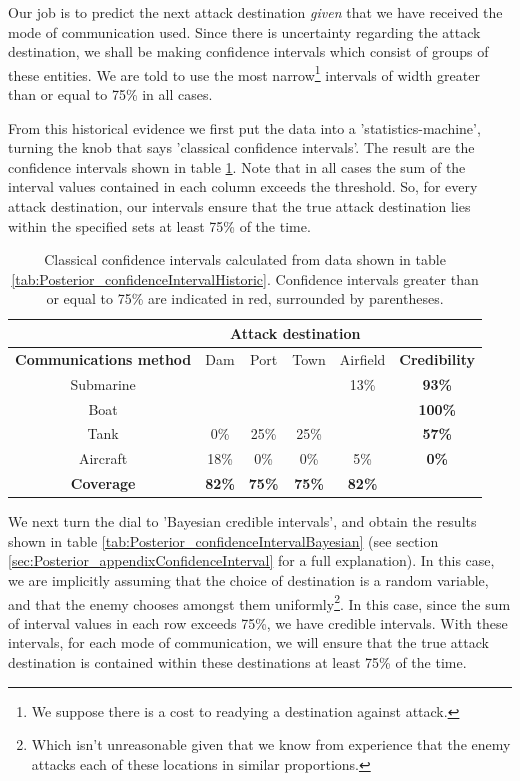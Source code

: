 \documentclass[11pt,fullpage]{book}
\begin{document}
Our job is to predict the next attack destination \textit{given} that we have received the mode of communication used. Since there is uncertainty regarding the attack destination, we shall be making confidence intervals which consist of groups of these entities. We are told to use the most narrow\footnote{We suppose there is a cost to readying a destination against attack.} intervals of width greater than or equal to 75\% in all cases.

From this historical evidence we first put the data into a 'statistics-machine', turning the knob that says 'classical confidence intervals'. The result are the confidence intervals shown in table \ref{tab:Posterior_confidenceIntervalClassical}. Note that in all cases the sum of the interval values contained in each column exceeds the threshold. So, for every attack destination, our intervals ensure that the true attack destination lies within the specified sets at least 75\% of the time.

\begin{table}[htbp]
  \centering
    \begin{tabular}{cccccc}
    \toprule
          & \multicolumn{4}{c}{\textbf{Attack destination}} & \multicolumn{1}{c}{\textbf{}} \\
    \midrule
    \textbf{Communications method} & Dam & Port & Town & Airfield   & \textbf{Credibility} \\
    Submarine & \color{red}{$[$73\%}  & \color{red}{50\%}  & \color{red}{50\%$]$}  & 13\%  & \textbf{93\%} \\
    Boat  & \color{red}{$[$9\%}   & \color{red}{25\%}  & \color{red}{25\%}  & \color{red}{16\%$]$}  & \textbf{100\%} \\
    Tank  & 0\%   & 25\%  & 25\%  & \color{red}{$[$66\%$]$}  & \textbf{57\%} \\
    Aircraft & 18\%   & 0\%  & 0\%   & 5\%   & \textbf{0\%} \\
    \bottomrule
    \textbf{Coverage} & \textbf{82\%}  & \textbf{75\%}  & \textbf{75\%}  & \textbf{82\%} &  \\
    \end{tabular}%
  \caption{Classical confidence intervals calculated from data shown in table \ref{tab:Posterior_confidenceIntervalHistoric}. Confidence intervals greater than or equal to 75\% are indicated in red, surrounded by parentheses.}\label{tab:Posterior_confidenceIntervalClassical}%
\end{table}%

We next turn the dial to 'Bayesian credible intervals', and obtain the results shown in table \ref{tab:Posterior_confidenceIntervalBayesian} (see section \ref{sec:Posterior_appendixConfidenceInterval} for a full explanation). In this case, we are implicitly assuming that the choice of destination is a random variable, and that the enemy chooses amongst them uniformly\footnote{Which isn't unreasonable given that we know from experience that the enemy attacks each of these locations in similar proportions.}. In this case, since the sum of interval values in each row exceeds 75\%, we have credible intervals. With these intervals, for each mode of communication, we will ensure that the true attack destination is contained within these destinations at least 75\% of the time.
\end{document}
